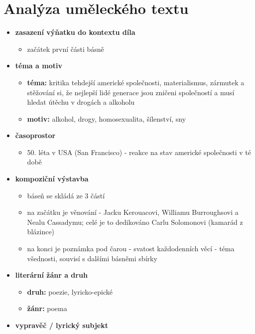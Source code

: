 \documentclass[11pt]{article}
\begin{document}
    \section*{Analýza uměleckého textu}
    \begin{itemize}
        \item\textbf{zasazení výňatku do kontextu díla}
        \begin{itemize}
            \item začátek první části básně
        \end{itemize}
        \item\textbf{téma a motiv}
        \begin{itemize}
            \item\textbf{téma: }kritika tehdejší americké společnosti, materialismus, zármutek a stěžování si, že nejlepší lidé generace jsou zničeni společností a musí hledat útěchu v drogách a alkoholu
            \item\textbf{motiv: }alkohol, drogy, homosexualita, šílenství, sny
        \end{itemize}
        \item\textbf{časoprostor}
        \begin{itemize}
            \item 50. léta v USA (San Francisco) - reakce na stav americké společnosti v té době
        \end{itemize}
        \item\textbf{kompoziční výstavba}
        \begin{itemize}
            \item báseň se skládá ze 3 částí
            \item na začátku je věnování - Jacku Kerouacovi, Williamu Burroughsovi a Nealu Cassadymu; celé je to dedikováno Carlu Solomonovi (kamarád z blázince)
            \item na konci je poznámka pod čarou - svatost každodenních věcí - téma všednosti, souvisí s dalšími básněmi sbírky
        \end{itemize}
        \item\textbf{literární žánr a druh}
        \begin{itemize}
            \item\textbf{druh: }poezie, lyricko-epické
            \item\textbf{žánr: }poema
        \end{itemize}
        \item\textbf{vypravěč / lyrický subjekt}

\end{itemize}
\end{document}
